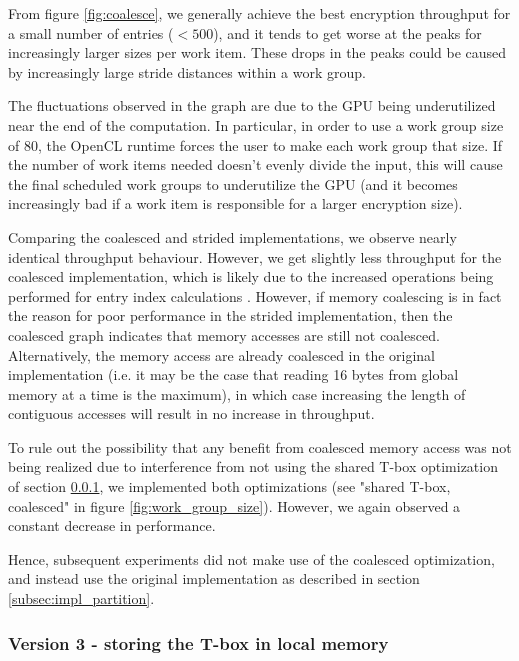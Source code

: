 \documentclass[conference,10pt]{IEEEtran}
\begin{document}
From figure \ref{fig:coalesce}, we generally achieve the best encryption throughput for a small number of 
entries ($< 500$), and it tends to get worse at the peaks for increasingly larger sizes per work item.  
These drops in the peaks could be caused by increasingly large stride distances within a work group. 

The fluctuations observed in the graph are due to the GPU being underutilized near the end of the 
computation.  In particular, in order to use a work group size of 80, the OpenCL runtime forces the user to 
make each work group that size.  If the number of work items needed doesn't evenly divide the input, this 
will cause the final scheduled work groups to underutilize the GPU (and it becomes increasingly bad if a 
work item is responsible for a larger encryption size).

Comparing the coalesced and strided implementations, we observe nearly identical throughput behaviour.  
However, we get slightly less throughput for the coalesced implementation, which is likely due to the 
increased operations being performed for entry index calculations \cite{opencl_guide}.  However, if memory 
coalescing is in fact the reason for poor performance in the strided implementation, then the coalesced 
graph indicates that memory accesses are still not coalesced.  Alternatively, the memory access are already 
coalesced in the original implementation (i.e. it may be the case that reading 16 bytes from global memory 
at a time is the maximum), in which case increasing the length of contiguous accesses will result in no 
increase in throughput.

To rule out the possibility that any benefit from coalesced memory access was not being realized due to 
interference from not using the shared T-box optimization of section \ref{subsec:impl_shared_tbox}, we 
implemented both optimizations (see "shared T-box, coalesced" in figure \ref{fig:work_group_size}).  
However, we again observed a constant decrease in performance.  

Hence, subsequent experiments did not make use of the coalesced optimization, and instead use the original 
implementation as described in section \ref{subsec:impl_partition}.

\subsubsection{Version 3 - storing the T-box in local memory}
\label{subsec:impl_shared_tbox}
\end{document}
